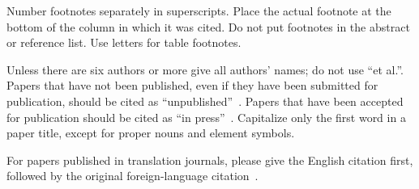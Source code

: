 Number footnotes separately in superscripts. Place the actual footnote at
the bottom of the column in which it was cited. Do not put footnotes in the
abstract or reference list. Use letters for table footnotes.

Unless there are six authors or more give all authors' names; do not use
``\textnormal{et al.}''. Papers that have not been published, even if they have been
submitted for publication, should be cited as ``unpublished''\ \cite{b4}. Papers
that have been accepted for publication should be cited as ``in press''\ \cite{b5}.
Capitalize only the first word in a paper title, except for proper nouns and
element symbols.

For papers published in translation journals, please give the English
citation first, followed by the original foreign-language citation\ \cite{b6}.